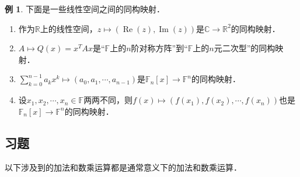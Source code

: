 \documentclass[a4paper,fontset=windows]{ctexbook}
\theoremstyle{definition}
\newtheorem{example}{例}[chapter]
\DeclareMathOperator{\im}{Im}
\DeclareMathOperator{\re}{Re}
\begin{document}
\begin{example}\label{ex8.5}
下面是一些线性空间之间的同构映射．
\begin{enumerate}
\item 作为$\mathbb{R}$上的线性空间，$z\mapsto(\re(z),\im(z))$是$\mathbb{C}\to\mathbb{R}^2$的同构映射．

\item $A\mapsto Q(x)=x^TAx$是“$\mathbb{F}$上的$n$阶对称方阵”到“$\mathbb{F}$上的$n$元二次型”的同构映射．

\item $\sum\limits_{k=0}^{n-1}a_kx^k\mapsto(a_0,a_1,\cdots,a_{n-1})$是$\mathbb{F}_n[x]\to\mathbb{F}^n$的同构映射．

\item 设$x_1,x_2,\cdots,x_n\in \mathbb{F}$两两不同，则$f(x)\mapsto(f(x_1),f(x_2),\cdots,f(x_n))$也是$\mathbb{F}_n[x]\to\mathbb{F}^n$的同构映射．
\end{enumerate}
\end{example}

\subsection*{习题}

\noindent 以下涉及到的加法和数乘运算都是通常意义下的加法和数乘运算．
\end{document}
